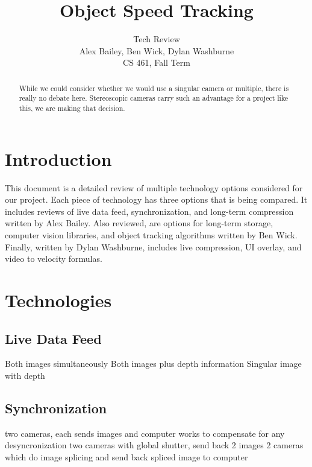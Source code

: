 \documentclass[letterpaper,10pt,onecolumn,draftclsnofoot]{IEEEtran}
\title{Object Speed Tracking}
\author{Tech Review\\Alex Bailey, Ben Wick, Dylan Washburne\\CS 461, Fall Term}
\begin{document}
\begin{titlepage}

\maketitle

\begin{abstract}
While we could consider whether we would use a singular camera or multiple, there is really no debate here.
Stereoscopic cameras carry such an advantage for a project like this, we are making that decision.
 
\end{abstract}

\end{titlepage}

\tableofcontents
\newpage

\section{Introduction}
This document is a detailed review of multiple technology options considered for our project. Each piece of technology has three options that is being compared. It includes reviews of live data feed, synchronization, and long-term compression written by Alex Bailey. Also reviewed, are options for long-term storage, computer vision libraries, and object tracking algorithms written by Ben Wick. Finally, written by Dylan Washburne, includes live compression, UI overlay, and video to velocity formulas.

\section{Technologies}

\subsection{Live Data Feed} %

Both images simultaneously
Both images plus depth information
Singular image with depth

\newpage
\subsection{Synchronization} %

two cameras, each sends images and computer works to compensate for any desyncronization
two cameras with global shutter, send back 2 images
2 cameras which do image splicing and send back spliced image to computer
\end{document}
